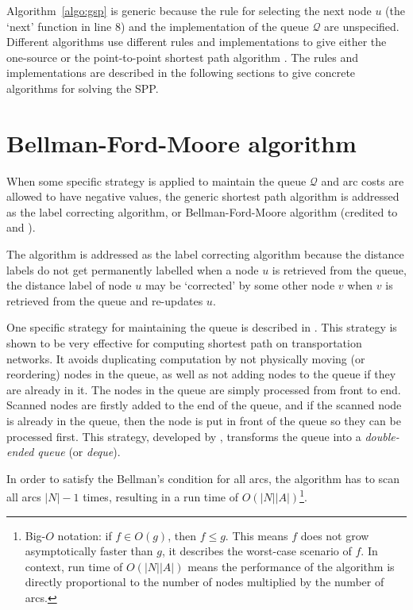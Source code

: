 Algorithm~\ref{algo:gsp} is generic because 
the rule for selecting the next node $u$ (the `next' function in line 8) and
the implementation of the queue $\mathcal{Q}$ are unspecified.
Different algorithms use different rules and implementations to give 
either the one-source or the point-to-point shortest path algorithm \citep{mplomer}.
The rules and implementations are described in the following sections to give concrete algorithms for solving the SPP.

\section{Bellman-Ford-Moore algorithm} \label{section:labelcorrectingalgorithm}
When some specific strategy is applied to maintain the queue $\mathcal{Q}$
and arc costs are allowed to have negative values,
the generic shortest path algorithm is addressed as the label correcting algorithm,
or Bellman-Ford-Moore algorithm (credited to \citet{Bellman, Ford} and \citet{Moore}).

The algorithm is addressed as the label correcting algorithm
because the distance labels do not get permanently labelled when a node $u$ is retrieved from the queue,
the distance label of node $u$ may be `corrected' by some other node $v$ when $v$ is retrieved from the queue and re-updates $u$.

One specific strategy for maintaining the queue is described in \citet{Sheffi}.
This strategy is shown to be very effective for computing shortest path on transportation networks.
It avoids duplicating computation by not physically moving (or reordering) nodes in the queue,
as well as not adding nodes to the queue if they are already in it.
The nodes in the queue are simply processed from front to end.
Scanned nodes are firstly added to the end of the queue,
and if the scanned node is already in the queue,
then the node is put in front of the queue so they can be processed first.
This strategy, developed by \citet{Pape}, transforms the queue into a \emph{double-ended queue} (or \emph{deque}).

In order to satisfy the Bellman's condition for all arcs,
the algorithm has to scan all arcs $|N|-1$ times,
resulting in a run time of $O(|N||A|)$\footnote{Big-$O$ notation: if $f \in O(g)$, then $f \leq g$. This means $f $ does not grow asymptotically faster than $g$, it describes the worst-case scenario of $f$. In context, run time of $O(|N||A|)$ means the performance of the algorithm is directly proportional to the number of nodes multiplied by the number of arcs.}.

